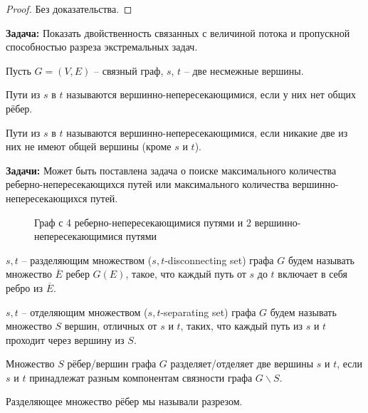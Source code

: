 	\begin{proof}
		Без доказательства.
	\end{proof}

	\textbf{Задача:} Показать двойственность связанных с величиной потока и пропускной способностью разреза экстремальных задач.


	Пусть $G = (V, E)$ -- связный граф, $s$, $t$ -- две несмежные вершины.

	\begin{Def}
		Пути из $s$ в $t$ называются вершинно-непересекающимися, если у них нет общих рёбер.
	\end{Def}

	\begin{Def}
		Пути из $s$ в $t$ называются вершинно-непересекающимися, если никакие две из них не имеют общей вершины (кроме $s$ и $t$).
	\end{Def}

	\textbf{Задачи:} Может быть поставлена задача о поиске максимального количества реберно-непересекающихся путей или максимального количества вершинно-непересекающихся путей.

	\begin{figure*}[h]
		\centering
		\def\svgwidth{0.5\columnwidth}
		
		\caption{Граф с 4 реберно-непересекающимися путями и 2 вершинно-непересекающимися путями}
	\end{figure*}

	\begin{Def}
		$s, t$ -- разделяющим множеством ($s, t$-disconnecting set) графа $G$ будем называть множество $\overline{E}$ ребер $G(E)$, такое, что каждый путь от $s$ до $t$ включает в себя ребро из $\overline{E}$.
	\end{Def}

	\begin{Def}
		$s, t$ -- отделяющим множеством ($s, t$-separating set) графа $G$ будем называть множество $S$ вершин, отличных от $s$ и $t$, таких, что каждый путь из $s$ и $t$ проходит через вершину из $S$.
	\end{Def}

	\begin{Def}[Альтернативные]
		Множество $S$ рёбер/вершин графа $G$ разделяет/отделяет две вершины $s$ и $t$, если $s$ и $t$ принадлежат разным компонентам связности графа $G \backslash S$.
	\end{Def}

	\begin{Rem}
		Разделяющее множество рёбер мы называли разрезом.
	\end{Rem}

